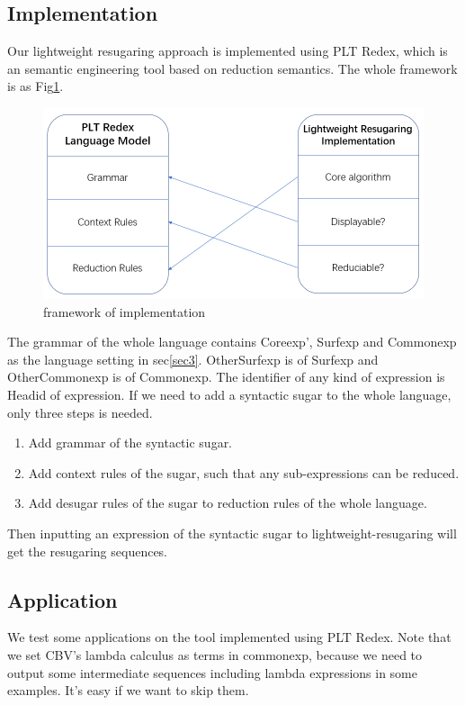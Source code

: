 \subsection{Implementation}

Our lightweight resugaring approach  is implemented using PLT Redex\cite{SEwPR}, which is an semantic engineering tool based on reduction semantics\cite{reduction}. The whole framework is as Fig\ref{fig:frame}.

\begin{figure}[h]
	\centering
	\includegraphics[width=12cm]{images/frame.png}
	\caption{framework of implementation}
	\label{fig:frame}
\end{figure}

The grammar of the whole language contains Coreexp', Surfexp and Commonexp as the language setting in sec\ref{sec3}. OtherSurfexp is of Surfexp and OtherCommonexp is of Commonexp. The identifier of any kind of expression is Headid of expression. If we need to add a syntactic sugar to the whole language, only three steps is needed.

\begin{enumerate}
\item Add grammar of the syntactic sugar.
\item Add context rules of the sugar, such that any sub-expressions can be reduced.
\item Add desugar rules of the sugar to reduction rules of the whole language.
\end{enumerate}

Then inputting an expression of the syntactic sugar to lightweight-resugaring will get the resugaring sequences.

\subsection{Application}

We test some applications on the tool implemented using PLT Redex. Note that we set CBV's lambda calculus as terms in commonexp, because we need to output some intermediate sequences including lambda expressions in some examples. It's easy if we want to skip them.

